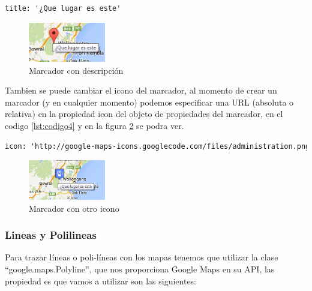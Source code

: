 \begin{lstlisting}[language=HTML, caption=Descripción emergente, label=lst:codigo3]
    title: '¿Que lugar es este'
\end{lstlisting}

    \begin{figure}[hbtp]
        \centering
            \includegraphics[width=0.3\textwidth]{Imagenes/Cap2_3_5.png}
            \caption{Marcador con descripción}    
            \label{fig:Cap2_3_5}
    \end{figure}

\hspace*{1cm}Tambien se puede cambiar el icono del marcador, al momento de crear un marcador (y en cualquier momento) podemos especificar una URL (absoluta o relativa) en la propiedad icon del objeto de propiedades del marcador, en el codigo \ref{lst:codigo4} y en la figura \ref {fig:Cap2_3_6} se podra ver.\\

\begin{lstlisting}[language=HTML, caption=Ícono de marcador, label=lst:codigo4]
    icon: 'http://google-maps-icons.googlecode.com/files/administration.png'
\end{lstlisting}

    \begin{figure}[hbtp]
        \centering
            \includegraphics[width=0.3\textwidth]{Imagenes/Cap2_3_6.png}
            \caption{Marcador con otro icono}      
            \label{fig:Cap2_3_6}
    \end{figure}    

\subsubsection{Lineas y Polilineas}
   Para trazar líneas o poli-líneas con los mapas tenemos que utilizar la clase
   “google.maps.Polyline”, que nos proporciona Google Maps en su API, las propiedad    es que vamos a utilizar son las siguientes:\\
   
